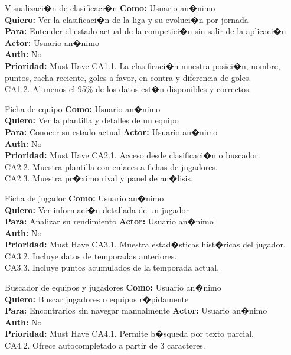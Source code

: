 {Visualizaci�n de clasificaci�n}
{\textbf{Como:} Usuario an�nimo\\ \textbf{Quiero:} Ver la clasificaci�n de la liga y su evoluci�n por jornada\\ \textbf{Para:} Entender el estado actual de la competici�n sin salir de la aplicaci�n}
{\textbf{Actor:} Usuario an�nimo\\ \textbf{Auth:} No\\ \textbf{Prioridad:} Must Have}
{CA1.1. La clasificaci�n muestra posici�n, nombre, puntos, racha reciente, goles a favor, en contra y diferencia de goles.\\ CA1.2. Al menos el 95\% de los datos est�n disponibles y correctos.}

{Ficha de equipo}
{\textbf{Como:} Usuario an�nimo\\ \textbf{Quiero:} Ver la plantilla y detalles de un equipo\\ \textbf{Para:} Conocer su estado actual}
{\textbf{Actor:} Usuario an�nimo\\ \textbf{Auth:} No\\ \textbf{Prioridad:} Must Have}
{CA2.1. Acceso desde clasificaci�n o buscador.\\ CA2.2. Muestra plantilla con enlaces a fichas de jugadores.\\ CA2.3. Muestra pr�ximo rival y panel de an�lisis.}

{Ficha de jugador}
{\textbf{Como:} Usuario an�nimo\\ \textbf{Quiero:} Ver informaci�n detallada de un jugador\\ \textbf{Para:} Analizar su rendimiento}
{\textbf{Actor:} Usuario an�nimo\\ \textbf{Auth:} No\\ \textbf{Prioridad:} Must Have}
{CA3.1. Muestra estad�sticas hist�ricas del jugador.\\ CA3.2. Incluye datos de temporadas anteriores.\\ CA3.3. Incluye puntos acumulados de la temporada actual.}

{Buscador de equipos y jugadores}
{\textbf{Como:} Usuario an�nimo\\ \textbf{Quiero:} Buscar jugadores o equipos r�pidamente\\ \textbf{Para:} Encontrarlos sin navegar manualmente}
{\textbf{Actor:} Usuario an�nimo\\ \textbf{Auth:} No\\ \textbf{Prioridad:} Must Have}
{CA4.1. Permite b�squeda por texto parcial.\\ CA4.2. Ofrece autocompletado a partir de 3 caracteres.}


